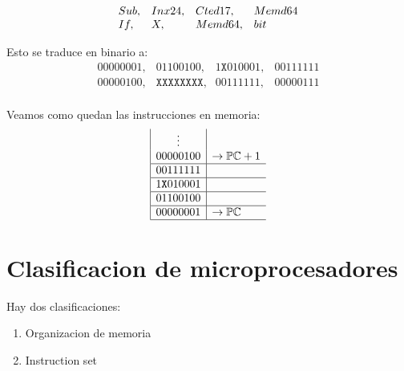 \documentclass{report}
\begin{document}
\[
	\begin{array}{llll}
		Sub, & Inx24, & Cted17, & Memd64 \\
		If,  & X,     & Memd64, & bit    \\
	\end{array} \\
\]

Esto se traduce en binario a:\\

\[
	\begin{array}{llll}
		00000001, & 01100100,          & 1\texttt{X}010001, & 00111111 \\
		00000100, & \texttt{XXXXXXXX}, & 00111111,          & 00000111 \\
	\end{array}
\]

Veamos como quedan las instrucciones en memoria:\\

\[
	\begin{array}{|c|l}
		\vdots            &                           \\
		00000100          & \rightarrow \mathbb{PC}+1 \\ \hline
		00111111          &                           \\ \hline
		1\texttt{X}010001 &                           \\ \hline
		01100100          &                           \\ \hline
		00000001          & \rightarrow \mathbb{PC}   \\ \hline
	\end{array}
\]

\section{Clasificacion de microprocesadores}

Hay dos clasificaciones:\\
\begin{enumerate}
	\item Organizacion de memoria
	\item Instruction set
\end{enumerate}
\end{document}
